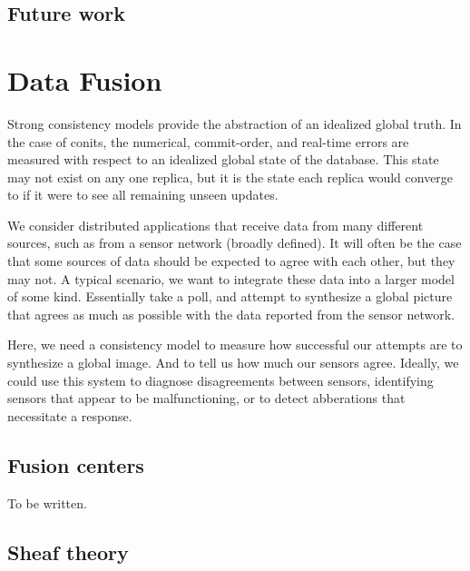 \documentclass[]             %
{NASA}                       %
\theoremstyle{definition}
\begin{document}
\hypertarget{future-work}{%
  \subsection{Future work}\label{future-work}}

\hypertarget{data-fusion}{%
  \section{Data Fusion}\label{data-fusion}}

\cite{1999:lucien-datafusion}

\label{sec:data-fusion}

Strong consistency models provide the abstraction of an idealized global
truth. In the case of conits, the numerical, commit-order, and real-time
errors are measured with respect to an idealized global state of the
database. This state may not exist on any one replica, but it is the
state each replica would converge to if it were to see all remaining
unseen updates.

We consider distributed applications that receive data from many
different sources, such as from a sensor network (broadly defined). It
will often be the case that some sources of data should be expected to
agree with each other, but they may not. A typical scenario, we want to
integrate these data into a larger model of some kind. Essentially take
a poll, and attempt to synthesize a global picture that agrees as much
as possible with the data reported from the sensor network.

Here, we need a consistency model to measure how successful our attempts
are to synthesize a global image. And to tell us how much our sensors
agree. Ideally, we could use this system to diagnose disagreements
between sensors, identifying sensors that appear to be malfunctioning,
or to detect abberations that necessitate a response.

\hypertarget{fusion-centers}{%
  \subsection{Fusion centers}\label{fusion-centers}}

To be written.

\hypertarget{sheaf-theory}{%
  \subsection{Sheaf theory}\label{sheaf-theory}}
\end{document}
